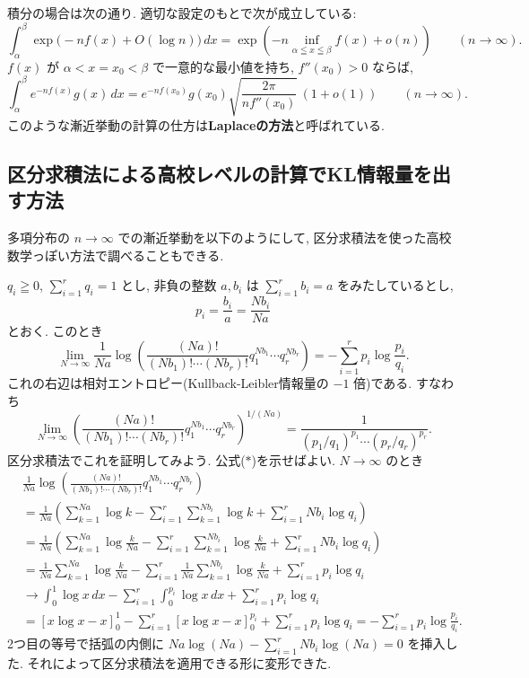 \documentclass[12pt,twoside]{jarticle}
\theoremstyle{jplain}
\theoremstyle{jplain}
\theoremstyle{jplain}
\numberwithin{theorem}{section}
\numberwithin{equation}{section}
\numberwithin{figure}{section}
\numberwithin{table}{section}
\begin{document}
積分の場合は次の通り.
適切な設定のもとで次が成立している:
\[
\int_\alpha^\beta \exp\biggl(-nf(x)+O(\log n)\biggr)\,dx
=
\exp\left(-n\inf_{\alpha\leqq x\leqq\beta} f(x) + o(n)\right)
\qquad
(n\to\infty).
\]
$f(x)$ が $\alpha<x=x_0<\beta$ で一意的な最小値を持ち, 
$f''(x_0)>0$ ならば,
\[
\int_\alpha^\beta e^{-nf(x)}g(x)\,dx
=
e^{-nf(x_0)}g(x_0)\sqrt{\frac{2\pi}{n f''(x_0)}}\,(1+o(1))
\qquad
(n\to\infty).
\]
このような漸近挙動の計算の仕方は{\bf Laplaceの方法}と呼ばれている.


\subsection{区分求積法による高校レベルの計算でKL情報量を出す方法}
\label{sec:quadrature-by-parts}

多項分布の $n\to\infty$ での漸近挙動を以下のようにして, 
区分求積法を使った高校数学っぽい方法で調べることもできる.

$q_i\geqq 0$, $\sum_{i=1}^r q_i=1$ とし, 
非負の整数 $a,b_i$ は $\sum_{i=1}^r b_i=a$ をみたしているとし, 
\[
p_i=\frac{b_i}{a}=\frac{Nb_i}{Na}
\]とおく.  このとき
\[
\lim_{N\to\infty}\frac{1}{Na}
\log\left(\frac{(Na)!}{(Nb_1)!\cdots(Nb_r)!}q_1^{Nb_1}\cdots q_r^{Nb_r}\right)
=-\sum_{i=1}^r p_i\log\frac{p_i}{q_i}.
\tag{$*$}
\]
これの右辺は相対エントロピー(Kullback-Leibler情報量の $-1$ 倍)である. 
すなわち
\[
\lim_{N\to\infty}
\left(\frac{(Na)!}{(Nb_1)!\cdots(Nb_r)!}q_1^{Nb_1}\cdots q_r^{Nb_r}\right)^{1/(Na)}
=\frac{1}{(p_1/q_1)^{p_1}\cdots (p_r/q_r)^{p_r}}.
\]
区分求積法でこれを証明してみよう. 公式($*$)を示せばよい. $N\to\infty$ のとき
\begin{align*}
&
\frac{1}{Na}
\log\left(\frac{(Na)!}{(Nb_1)!\cdots(Nb_r)!}q_1^{Nb_1}\cdots q_r^{Nb_r}\right)
\\ &
=\frac{1}{Na}
\left(
\sum_{k=1}^{Na}\log k
-\sum_{i=1}^r\sum_{k=1}^{Nb_i}\log k
+\sum_{i=1}^rNb_i\log q_i
\right)
\\ &
=\frac{1}{Na}
\left(
\sum_{k=1}^{Na}\log \frac{k}{Na}
-\sum_{i=1}^r\sum_{k=1}^{Nb_i}\log \frac{k}{Na}
+\sum_{i=1}^rNb_i\log q_i
\right)
\\ &
=\frac{1}{Na}\sum_{k=1}^{Na}\log \frac{k}{Na}
-\sum_{i=1}^r\frac{1}{Na}\sum_{k=1}^{Nb_i}\log \frac{k}{Na}
+\sum_{i=1}^r p_i\log q_i
\\ &
\to
\int_0^1 \log x\,dx 
- \sum_{i=1}^r\int_0^{p_i}\log x\,dx 
+ \sum_{i=1}^r p_i\log q_i
\\ &
=[x\log x-x]_0^1
-\sum_{i=1}^r[x\log x-x]_0^{p_i}
+\sum_{i=1}^r p_i\log q_i
=-\sum_{i=1}^r p_i\log\frac{p_i}{q_i}.
\end{align*}
2つ目の等号で括弧の内側に
\(
Na\log(Na)-\sum_{i=1}^rNb_i\log(Na)=0
\)
を挿入した. それによって区分求積法を適用できる形に変形できた.
\end{document}
